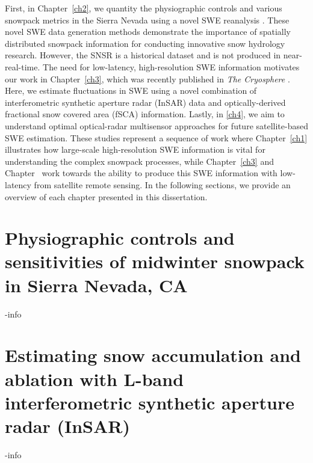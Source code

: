 First, in Chapter~\ref{ch2}, we quantity the physiographic controls and various snowpack metrics in the Sierra Nevada using a novel SWE reanalysis \citep{margulisLandsatEraSierraNevada2016}. These novel SWE data generation methods demonstrate the importance of spatially distributed snowpack information for conducting innovative snow hydrology research. However, the SNSR is a historical dataset and is not produced in near-real-time. The need for low-latency, high-resolution SWE information motivates our work in Chapter~\ref{ch3}, which was recently published in \emph{The Cryosphere} \citep{tarriconeEstimatingSnowAccumulation2023a}. Here, we estimate fluctuations in SWE using a novel combination of interferometric synthetic aperture radar (InSAR) data and optically-derived fractional snow covered area (fSCA) information. Lastly, in \ref{ch4}, we aim to understand optimal optical-radar multisensor approaches for future satellite-based SWE estimation. These studies represent a sequence of work where Chapter~\ref{ch1} illustrates how large-scale high-resolution SWE information is vital for understanding the complex snowpack processes, while Chapter~\ref{ch3} and Chapter~ work towards the ability to produce this SWE information with low-latency from satellite remote sensing. In the following sections, we provide an overview of each chapter presented in this dissertation.

\hypertarget{ch1-intro}{\section{Physiographic controls and sensitivities of midwinter snowpack in Sierra Nevada, CA}\label{ch1-intro}}

-info

\hypertarget{ch1-intro-1}{\section{Estimating snow accumulation and ablation with L-band interferometric synthetic aperture radar (InSAR)}\label{ch1-intro-1}}

-info

